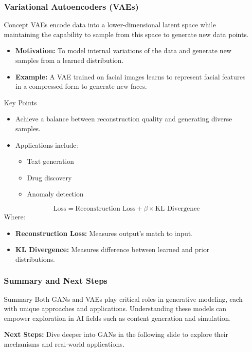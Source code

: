 \documentclass[aspectratio=169]{beamer}
\begin{document}
\begin{frame}[fragile]
    \frametitle{Variational Autoencoders (VAEs)}
    
    \begin{block}{Concept}
        VAEs encode data into a lower-dimensional latent space while maintaining the capability to sample from this space to generate new data points.
    \end{block}

    \begin{itemize}
        \item \textbf{Motivation:} To model internal variations of the data and generate new samples from a learned distribution.
        \item \textbf{Example:} A VAE trained on facial images learns to represent facial features in a compressed form to generate new faces.
    \end{itemize}

    \begin{block}{Key Points}
        \begin{itemize}
            \item Achieve a balance between reconstruction quality and generating diverse samples.
            \item Applications include:
                \begin{itemize}
                    \item Text generation
                    \item Drug discovery
                    \item Anomaly detection
                \end{itemize}
        \end{itemize}
    \end{block}
    
    \begin{equation}
        \text{Loss} = \text{Reconstruction Loss} + \beta \times \text{KL Divergence}
    \end{equation}
    Where:
    \begin{itemize}
        \item \textbf{Reconstruction Loss:} Measures output's match to input.
        \item \textbf{KL Divergence:} Measures difference between learned and prior distributions.
    \end{itemize}
\end{frame}

\begin{frame}[fragile]
    \frametitle{Summary and Next Steps}
    
    \begin{block}{Summary}
        Both GANs and VAEs play critical roles in generative modeling, each with unique approaches and applications. Understanding these models can empower exploration in AI fields such as content generation and simulation.
    \end{block}
    
    \textbf{Next Steps:} Dive deeper into GANs in the following slide to explore their mechanisms and real-world applications.
\end{frame}
\end{document}
